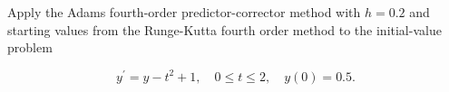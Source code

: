 %
%
%
%
%

\begin{example}\label{exam:multistepexm5}
Apply the Adams fourth-order predictor-corrector method with $h=0.2$ and starting values from the Runge-Kutta fourth order method to the initial-value problem

$$
y^{\prime}=y-t^{2}+1, \quad 0 \leq t \leq 2, \quad y(0)=0.5 .
$$
\end{example}


